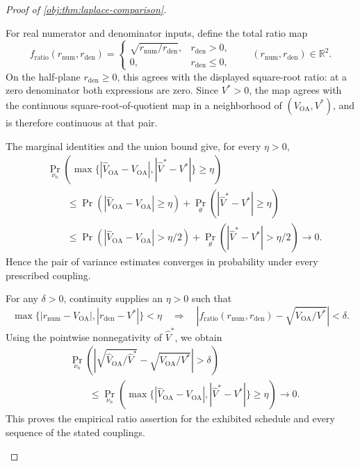 \documentclass[11pt]{article}
\begin{document}
\begin{proof}[Proof of \cref{obj:thm:laplace-comparison}]
\begin{enumerate}
For real numerator and denominator inputs, define the total ratio map
\[
f_{\mathrm{ratio}}(r_{\mathrm{num}},r_{\mathrm{den}})
=
\begin{cases}
\sqrt{r_{\mathrm{num}}/r_{\mathrm{den}}},
&r_{\mathrm{den}}>0,\\
0,&r_{\mathrm{den}}\le0,
\end{cases}
\qquad
(r_{\mathrm{num}},r_{\mathrm{den}})\in\mathbb R^2.
\]
On the half-plane \(r_{\mathrm{den}}\ge0\), this agrees with the displayed square-root ratio: at a zero denominator both expressions are zero. Since \(V^*>0\), the map agrees with the continuous square-root-of-quotient map in a neighborhood of \((V_{\mathrm{OA}},V^*)\), and is therefore continuous at that pair.

The marginal identities and the union bound give, for every \(\eta>0\),
\[
\begin{aligned}
&\Pr_{\nu_n}\!\left(
\max\{|\widehat V_{\mathrm{OA}}-V_{\mathrm{OA}}|,
       |\widehat V^*-V^*|\}\ge\eta
\right)\\
&\qquad\le
\Pr\!\left(|\widehat V_{\mathrm{OA}}-V_{\mathrm{OA}}|\ge\eta\right)
+
\Pr_\theta\!\left(|\widehat V^*-V^*|\ge\eta\right)\\
&\qquad\le
\Pr\!\left(|\widehat V_{\mathrm{OA}}-V_{\mathrm{OA}}|>\eta/2\right)
+
\Pr_\theta\!\left(|\widehat V^*-V^*|>\eta/2\right)
\longrightarrow0.
\end{aligned}
\]
Hence the pair of variance estimates converges in probability under every prescribed coupling.

For any \(\delta>0\), continuity supplies an \(\eta>0\) such that
\[
\max\{|r_{\mathrm{num}}-V_{\mathrm{OA}}|,
       |r_{\mathrm{den}}-V^*|\}<\eta
\quad\Longrightarrow\quad
\left|
f_{\mathrm{ratio}}(r_{\mathrm{num}},r_{\mathrm{den}})
-\sqrt{V_{\mathrm{OA}}/V^*}
\right|<\delta.
\]
Using the pointwise nonnegativity of \(\widehat V^*\), we obtain
\[
\begin{aligned}
&\Pr_{\nu_n}\!\left(
\left|
\sqrt{\widehat V_{\mathrm{OA}}/\widehat V^*}
-\sqrt{V_{\mathrm{OA}}/V^*}
\right|>\delta
\right)\\
&\qquad\le
\Pr_{\nu_n}\!\left(
\max\{|\widehat V_{\mathrm{OA}}-V_{\mathrm{OA}}|,
       |\widehat V^*-V^*|\}\ge\eta
\right)
\longrightarrow0.
\end{aligned}
\]
This proves the empirical ratio assertion for the exhibited schedule and every sequence of the stated couplings.


\end{enumerate}
\end{proof}
\end{document}
